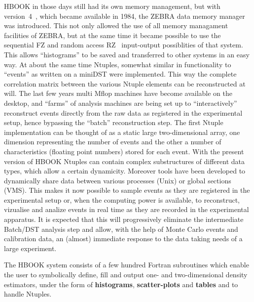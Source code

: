 HBOOK in those days still had its own memory management, but with 
version~4~\cite{bib-HBOOK4}, which became available in 1984, the
ZEBRA data memory manager was introduced.
This not only allowed the use of all memory managament facilities of ZEBRA,
but at the same time it became possible to use the sequential 
FZ and random access RZ~\cite{bib-ZEBRA} input-output
possiblities of that system.
This allows ``histograms'' to be saved and transferred to other systems
in an easy way.
At about the same time Ntuples, somewhat similar in functionality to 
``events'' as written on a miniDST were implemented.
This way the complete correlation matrix between the various
Ntuple elements can be reconstructed at will. 
The last few years multi Mflop machines have become available
on the desktop, and ``farms'' of analysis machines are being set up
to ``interactively'' reconstruct events directly from the
raw data as registered in the experimental setup, hence bypassing the
``batch'' reconstruction step.
The first Ntuple implementation can be thought of as a static large
two-dimensional array, one dimension representing the number of events
and the other a number of characteristics (floating point numbers)
stored for each event. 
With the present version of HBOOK Ntuples can contain complex
substructures of different data types, which allow a certain dynamicity.
Moreover tools have been developed to dynamically share
data between various processes (Unix) or global sections (VMS).
This makes it now possible to sample events as they are registered 
in the experimental setup or, when the computing power is
available, to reconstruct, vizualise and analize events in real time
as they are recorded in the experimental apparatus.
It is expected that this will progressively eliminate the intermediate
Batch/DST analysis step and allow, with the help of Monte Carlo events 
and calibration data, an (almost) immediate response to the
data taking needs of a large experiment.

\label{HOUTOPTS}

The HBOOK system consists of a few hundred Fortran
subroutines which enable the user to symbolically define, fill and output
one- and two-dimensional density estimators, under the form
of {\bf histograms}, {\bf scatter-plots} and {\bf tables} and
to handle Ntuples.


